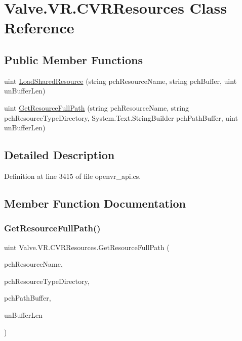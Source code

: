 \hypertarget{class_valve_1_1_v_r_1_1_c_v_r_resources}{}\section{Valve.\+V\+R.\+C\+V\+R\+Resources Class Reference}
\label{class_valve_1_1_v_r_1_1_c_v_r_resources}
\subsection*{Public Member Functions}
\begin{DoxyCompactItemize}
\item 
uint \mbox{\hyperlink{class_valve_1_1_v_r_1_1_c_v_r_resources_abaf157d3efd7e7e055d5f9d6cfd8dec0}{Load\+Shared\+Resource}} (string pch\+Resource\+Name, string pch\+Buffer, uint un\+Buffer\+Len)
\item 
uint \mbox{\hyperlink{class_valve_1_1_v_r_1_1_c_v_r_resources_ad34ee13815f4eea465f7feed4498b5c2}{Get\+Resource\+Full\+Path}} (string pch\+Resource\+Name, string pch\+Resource\+Type\+Directory, System.\+Text.\+String\+Builder pch\+Path\+Buffer, uint un\+Buffer\+Len)
\end{DoxyCompactItemize}


\subsection{Detailed Description}


Definition at line 3415 of file openvr\+\_\+api.\+cs.



\subsection{Member Function Documentation}
\mbox{\label{class_valve_1_1_v_r_1_1_c_v_r_resources_ad34ee13815f4eea465f7feed4498b5c2}} 
\subsubsection{\texorpdfstring{GetResourceFullPath()}{GetResourceFullPath()}}
{\footnotesize\ttfamily uint Valve.\+V\+R.\+C\+V\+R\+Resources.\+Get\+Resource\+Full\+Path (\begin{DoxyParamCaption}\item[{string}]{pch\+Resource\+Name,  }\item[{string}]{pch\+Resource\+Type\+Directory,  }\item[{System.\+Text.\+String\+Builder}]{pch\+Path\+Buffer,  }\item[{uint}]{un\+Buffer\+Len }\end{DoxyParamCaption})}



